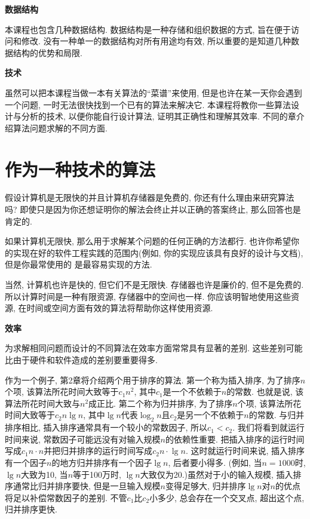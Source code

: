 \documentclass[oneside,10pt]{ctexbook}
\begin{document}
\textbf{数据结构}

本课程也包含几种数据结构. 数据结构是一种存储和组织数据的方式, 旨在便于访问和修改. 没有一种单一的数据结构对所有用途均有效, 所以重要的是知道几种数据结构的优势和局限.

\textbf{技术}

虽然可以把本课程当做一本有关算法的``菜谱''来使用, 但是也许在某一天你会遇到一个问题, 一时无法很快找到一个已有的算法来解决它. 本课程将教你一些算法设计与分析的技术, 以便你能自行设计算法, 证明其正确性和理解其效率. 不同的章介绍算法问题求解的不同方面.

\section{作为一种技术的算法}

假设计算机是无限快的并且计算机存储器是免费的, 你还有什么理由来研究算法吗? 即使只是因为你还想证明你的解法会终止并以正确的答案终止, 那么回答也是肯定的.

如果计算机无限快, 那么用于求解某个问题的任何正确的方法都行. 也许你希望你的实现在好的软件工程实践的范围内(例如, 你的实现应该具有良好的设计与文档), 但是你最常使用的
是最容易实现的方法.

当然, 计算机也许是快的, 但它们不是无限快. 存储器也许是廉价的, 但不是免费的. 所以计算时间是一种有限资源, 存储器中的空间也一样. 你应该明智地使用这些资源, 在时间或空间方面有效的算法将帮助你这样使用资源.

\textbf{效率}

为求解相同问题而设计的不同算法在效率方面常常具有显著的差别. 这些差别可能比由于硬件和软件造成的差别要重要得多.

作为一个例子, 第2章将介绍两个用于排序的算法. 第一个称为插入排序, 为了排序$n$个项, 该算法所花时间大致等于$c_1n^2$, 其中$c_1$是一个不依赖于$n$的常数. 也就是说, 该算法所花时间大致与$n^2$成正比. 第二个称为归并排序, 为了排序$n$个项, 该算法所花时间大致等于$c_2n\lg{n}$, 其中$\lg{n}$代表$\log_2n$且$c_2$是另一个不依赖于$n$的常数. 与归并排序相比, 插入排序通常具有一个较小的常数因子, 所以$c_1<c_2$. 我们将看到就运行时间来说, 常数因子可能远没有对输入规模$n$的依赖性重要. 把插入排序的运行时间写成$c_1n\cdot n$并把归并排序的运行时间写成$c_2n\cdot \lg{n}$. 这时就运行时间来说, 插入排序有一个因子$n$的地方归并排序有一个因子$\lg{n}$, 后者要小得多. (例如, 当$n=1000$时, $\lg{n}$大致为10, 当$n$等于100万时, $\lg{n}$大致仅为20.)虽然对于小的输入规模, 插入排序通常比归并排序要快, 但是一旦输入规模$n$变得足够大, 归并排序$\lg{n}$对$n$的优点将足以补偿常数因子的差别. 不管$c_1$比$c_2$小多少, 总会存在一个交叉点, 超出这个点, 归并排序更快.
\end{document}
